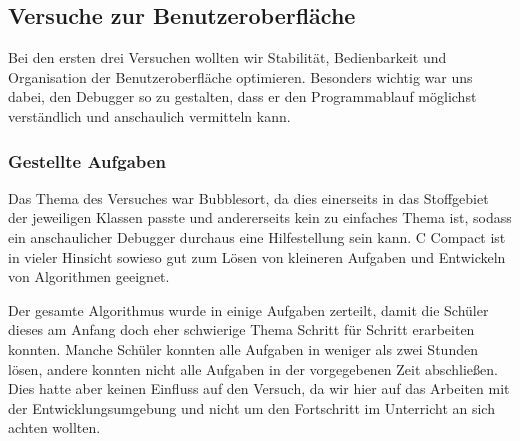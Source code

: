 

\subsection{Versuche zur Benutzeroberfläche}
Bei den ersten drei Versuchen wollten wir Stabilität, Bedienbarkeit und Organisation der Benutzeroberfläche optimieren. Besonders wichtig war uns dabei, den Debugger so zu gestalten, dass er den Programmablauf möglichst verständlich und anschaulich vermitteln kann.

\subsubsection*{Gestellte Aufgaben}
Das Thema des Versuches war Bubblesort, da dies einerseits in das Stoffgebiet der jeweiligen Klassen passte und andererseits kein zu einfaches Thema ist, sodass ein anschaulicher Debugger durchaus eine Hilfestellung sein kann. C Compact ist in vieler Hinsicht sowieso gut zum Lösen von kleineren Aufgaben und Entwickeln von Algorithmen geeignet.

Der gesamte Algorithmus wurde in einige Aufgaben zerteilt, damit die Schüler dieses am Anfang doch eher schwierige Thema Schritt für Schritt erarbeiten konnten. Manche Schüler konnten alle Aufgaben in weniger als zwei Stunden lösen, andere konnten nicht alle Aufgaben in der vorgegebenen Zeit abschließen. Dies hatte aber keinen Einfluss auf den Versuch, da wir hier auf das Arbeiten mit der Entwicklungsumgebung und nicht um den Fortschritt im Unterricht an sich achten wollten.

